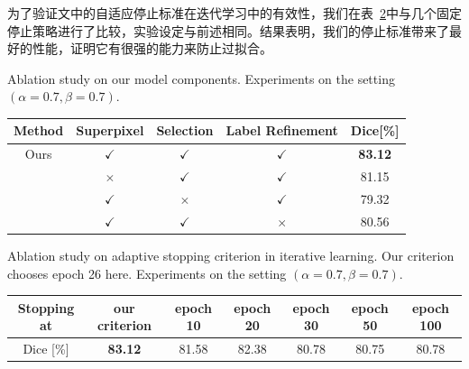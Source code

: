 为了验证文中的自适应停止标准在迭代学习中的有效性，我们在表~\ref{tab:ablate_stop}中与几个固定停止策略进行了比较，实验设定与前述相同。结果表明，我们的停止标准带来了最好的性能，证明它有很强的能力来防止过拟合。

    \begin{table}[t!]
        {Ablation study on our model components. Experiments on the setting $(\alpha=0.7, \beta=0.7)$.}
        \label{tab:ablate}\small
        \centering
            \setlength{\tabcolsep}{8pt}
            \begin{tabular}[t]{c|c|c|c|c}
                \toprule
                Method  & Superpixel    & Selection    & Label Refinement    & Dice[\%]  \\ \midrule
                Ours    & $\checkmark$  & $\checkmark$  & $\checkmark$  &  \textbf{83.12} \\   
                        & $\times$  & $\checkmark$  & $\checkmark$      &  81.15 \\                 
                        & $\checkmark$  & $\times$  & $\checkmark$      &  79.32 \\
                        & $\checkmark$  & $\checkmark$  & $\times$      &  80.56 \\
                \bottomrule
            \end{tabular}
    \end{table}

    \begin{table}[t]
        \centering
        {Ablation study on adaptive stopping criterion in iterative learning. Our criterion chooses epoch 26 here. Experiments on the setting $(\alpha=0.7, \beta=0.7)$.}
        \label{tab:ablate_stop}
        \setlength{\tabcolsep}{6pt}
            \begin{tabular}[t]{c|c|c|c|c|c|c}
                \toprule
                Stopping at & our criterion     & epoch 10 & epoch 20 & epoch 30 & epoch 50 & epoch 100   \\ \midrule  %
                Dice [\%]        & \textbf{83.12}   & 81.58 & 82.38 & 80.78    & 80.75    & 80.78       \\          %
                \bottomrule 
            \end{tabular}
    \end{table}

